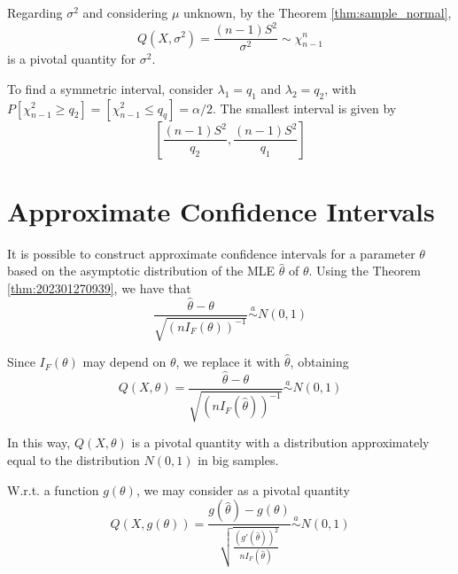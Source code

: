 \documentclass[12pt,a4paper]{report}
\begin{document}
Regarding $\sigma^2$ and considering $\mu$ unknown, by the Theorem \ref{thm:sample_normal}, 
\[
    Q(X, \sigma^2) = \frac{(n-1) S^2}{\sigma^2} \sim \chi_{n-1}^n
\]
is a pivotal quantity for $\sigma^2$. 

To find a symmetric interval, consider $\lambda_1 = q_1$ and $\lambda_2 = q_2$, with $P[\chi_{n-1}^2 \geq q_2] = [\chi_{n-1}^2 \leq q_q] = \alpha/2$. The smallest interval is given by 
\[
    \left[ \frac{(n-1) S^2}{q_2}, \frac{(n-1) S^2}{q_1} \right]
\]




\section{Approximate Confidence Intervals}

It is possible to construct approximate confidence intervals for a parameter $\theta$ based on the asymptotic distribution of the MLE $\hat{\theta}$ of $\theta$. Using the Theorem \ref{thm:202301270939}, we have that 
\[
    \frac{\hat{\theta} - \theta}{\sqrt{(n I_F(\theta))^{-1}}} \overset{a}{\sim} N(0,1)
\]

Since $I_F(\theta)$ may depend on $\theta$, we replace it with $\hat{\theta}$, obtaining 
\[
    Q(X, \theta) = \frac{\hat{\theta} - \theta}{\sqrt{(n I_F(\hat{\theta}))^{-1}}} \overset{a}{\sim} N(0,1)
\]

In this way, $Q(X, \theta)$ is a pivotal quantity with a distribution approximately equal to the distribution $N(0,1)$ in big samples. 

W.r.t. a function $g(\theta)$, we may consider as a pivotal quantity 
\[
    Q(X, g(\theta)) = \frac{g(\hat{\theta}) - g(\theta)}{\sqrt{\frac{(g'(\hat{\theta}))^2}{n I_F(\hat{\theta})}}} \overset{a}{\sim} N(0,1)
\]
\end{document}
